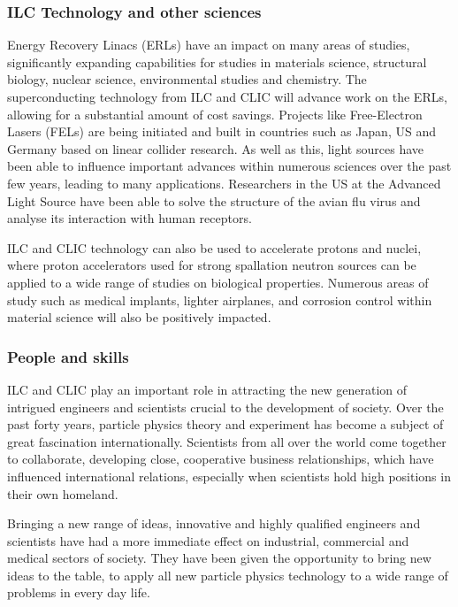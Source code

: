 \subsubsection{ILC Technology and other sciences}

Energy Recovery Linacs (ERLs) have an impact on many areas of studies, significantly expanding capabilities for studies in materials science, structural biology, nuclear science, environmental studies and chemistry. The superconducting technology from ILC and CLIC will advance work on the ERLs, allowing for a substantial amount of cost savings. Projects like Free-Electron Lasers (FELs) are being initiated and built in countries such as Japan, US and Germany based on linear collider research. As well as this, light sources have been able to influence important advances within numerous sciences over the past few years, leading to many applications. Researchers in the US at the Advanced Light Source have been able to solve the structure of the avian flu virus and analyse its interaction with human receptors.

ILC and CLIC technology can also be used to accelerate protons and nuclei, where proton accelerators used for strong spallation neutron sources can be applied to a wide range of studies on biological properties. Numerous areas of study such as medical implants, lighter airplanes, and corrosion control within material science will also be positively impacted. \cite{ILC:WhyNeed}

\subsubsection{People and skills}

ILC and CLIC play an important role in attracting the new generation of intrigued engineers and scientists crucial to the development of society. Over the past forty years, particle physics theory and experiment has become a subject of great fascination internationally. Scientists from all over the world come together to collaborate, developing close, cooperative business relationships, which have influenced international relations, especially when scientists hold high positions in their own homeland. 

Bringing a new range of ideas, innovative and highly qualified engineers and scientists have had a more immediate effect on industrial, commercial and medical sectors of society. They have been given the opportunity to bring new ideas to the table, to apply all new particle physics technology to a wide range of problems in every day life. 

